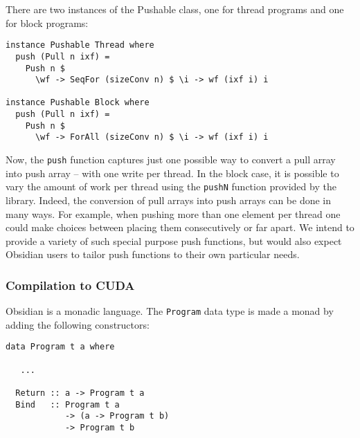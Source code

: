   
There are two instances of the Pushable class, one for thread programs and 
one for block programs:

\begin{small}
\begin{Verbatim}[samepage=true] 
instance Pushable Thread where
  push (Pull n ixf) =
    Push n $ 
      \wf -> SeqFor (sizeConv n) $ \i -> wf (ixf i) i

instance Pushable Block where
  push (Pull n ixf) =
    Push n $ 
      \wf -> ForAll (sizeConv n) $ \i -> wf (ixf i) i
\end{Verbatim} 
\end{small}  

Now, the {\tt push} function captures just one possible way to convert 
a pull array into push array -- with one write
per thread. In the block case, it is possible to vary 
the amount of work per thread using the {\tt pushN} function provided
by the library. 
Indeed, the conversion of pull arrays into push arrays can be done in many ways. 
For example, when pushing more than one element per thread one could make 
choices between placing them consecutively or far apart.
We intend to provide a variety of such special purpose push functions,
but would also expect Obsidian users to tailor push functions to
their own particular needs.


\subsubsection{Compilation to CUDA}
\label{sec:Compile}

Obsidian is a monadic language. The {\tt Program} 
data type is made a monad by adding the following constructors: 

\begin{small} 
\begin{Verbatim}[samepage=true] 
data Program t a where
 
   ... 
 
  Return :: a -> Program t a
  Bind   :: Program t a 
            -> (a -> Program t b) 
            -> Program t b
\end{Verbatim} 
\end{small} 
 
